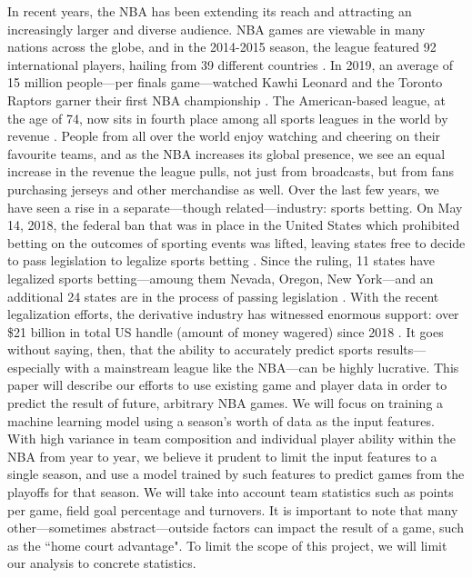 \documentclass[letterpaper]{article} %
\begin{document}
In recent years, the NBA has been extending its reach and attracting an increasingly larger and diverse audience. NBA games are viewable in many nations across the globe, and in the 2014-2015 season, the league featured 92 international players, hailing from 39 different countries \cite{jones2016predicting}. In 2019, an average of 15 million people---per finals game---watched Kawhi Leonard and the Toronto Raptors garner their first NBA championship \cite{gough_2019}. The American-based league, at the age of 74, now sits in fourth place among all sports leagues in the world by revenue \cite{amoros_2016}. People from all over the world enjoy watching and cheering on their favourite teams, and as the NBA increases its global presence, we see an equal increase in the revenue the league pulls, not just from broadcasts, but from fans purchasing jerseys and other merchandise as well. Over the last few years, we have seen a rise in a separate---though related---industry: sports betting. On May 14, 2018, the federal ban that was in place in the United States which prohibited betting on the outcomes of sporting events was lifted, leaving states free to decide to pass legislation to legalize sports betting \cite{licata_2019}. Since the ruling, 11 states have legalized sports betting---amoung them Nevada, Oregon, New York---and an additional 24 states are in the process of passing legislation \cite{licata_2019}. With the recent legalization efforts, the derivative industry has witnessed enormous support: over \$21 billion in total US handle (amount of money wagered) since 2018 \cite{legal_sports_report}. It goes without saying, then, that the ability to accurately predict sports results---especially with a mainstream league like the NBA---can be highly lucrative. This paper will describe our efforts to use existing game and player data in order to predict the result of future, arbitrary NBA games. We will focus on training a machine learning model using a season's worth of data as the input features. With high variance in team composition and individual player ability within the NBA from year to year, we believe it prudent to limit the input features to a single season, and use a model trained by such features to predict games from the playoffs for that season. We will take into account team statistics such as points per game, field goal percentage and turnovers. It is important to note that many other---sometimes abstract---outside factors can impact the result of a game, such as the ``home court advantage". To limit the scope of this project, we will limit our analysis to concrete statistics. \\
\end{document}
